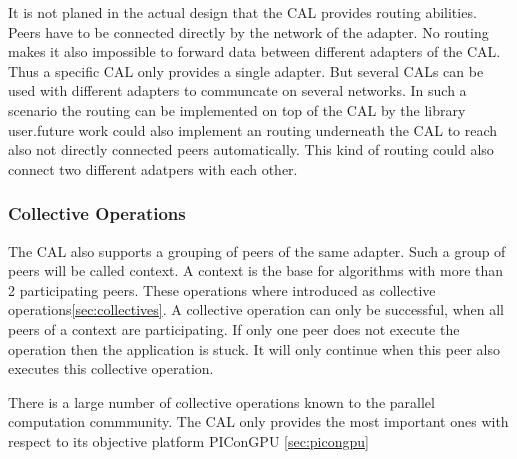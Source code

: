 It is not planed in the actual design that the CAL provides routing
abilities. Peers have to be connected directly by the network of the
adapter. No routing makes it also impossible to forward data between
different adapters of the CAL. Thus a specific CAL only provides a
single adapter. But several CALs can be used with different adapters
to communcate on several networks. In such a scenario the routing can
be implemented on top of the CAL by the library user.future work could
also implement an routing underneath the CAL to reach also not
directly connected peers automatically. This kind of routing
could also connect two different adatpers with each other.

\subsubsection{Collective Operations}
The CAL also supports a grouping of peers of the same adapter. Such a
group of peers will be called context. A context is the base for
algorithms with more than 2 participating peers. These operations
where introduced as collective operations\ref{sec:collectives}. A
collective operation can only be successful, when all peers of a
context are participating. If only one peer does not execute the
operation then the application is stuck. It will only continue when
this peer also executes this collective operation.

There is a large number of collective operations known to the
parallel computation commmunity. The CAL only provides the most
important ones with respect to its objective platform PIConGPU \ref{sec:picongpu}

